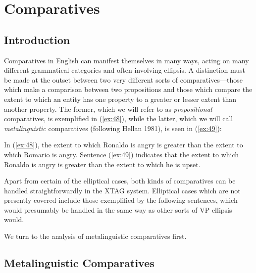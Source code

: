\chapter{Comparatives} 
\label{compars-chapter} 
 
\section{Introduction} 
 
Comparatives in English can manifest themselves in many ways, acting 
on many different grammatical categories and often involving ellipsis. 
A distinction must be made at the outset between two very different 
sorts of comparatives---those which make a comparison between two 
propositions and those which compare the extent to which an entity has 
one property to a greater or lesser extent than another property.  The 
former, which we will refer to as {\it propositional} comparatives, is 
exemplified in (\ref{ex:48}), while the latter, which we will call {\it metalinguistic} comparatives (following Hellan 1981), is seen in 
(\ref{ex:49}): 
 
\beginsentences
{}\label{ex:48} 
\label{ex:49} 
\endsentences

 
\noindent In (\ref{ex:48}), the extent to which Ronaldo is angry is greater 
than the extent to which Romario is angry.  Sentence (\ref{ex:49}) 
indicates that the extent to which Ronaldo is angry is greater than 
the extent to which he is upset. 
 
Apart from certain of the elliptical cases, both kinds of comparatives 
can be handled straightforwardly in the XTAG system.  Elliptical cases 
which are not presently covered include those exemplified by the 
following sentences, which would presumably be handled in the same way 
as other sorts of VP ellipsis would. 
 
\beginsentences
{}\label{ex:50} 
\label{ex:51} 
\label{ex:52} 
\endsentences

 
We turn to the analysis of metalinguistic comparatives first. 
 
\section{Metalinguistic Comparatives} 
 
